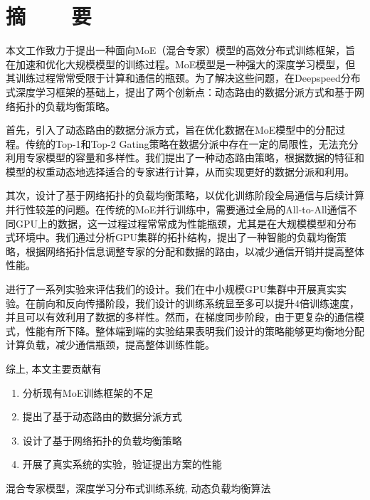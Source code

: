 \renewcommand{\baselinestretch}{1.5}
\fontsize{12pt}{13pt}\selectfont

\chapter[摘要]{摘~~~~要}

本文工作致力于提出一种面向MoE（混合专家）模型的高效分布式训练框架，旨在加速和优化大规模模型的训练过程。MoE模型是一种强大的深度学习模型，但其训练过程常常受限于计算和通信的瓶颈。为了解决这些问题，在Deepspeed分布式深度学习框架的基础上，提出了两个创新点：动态路由的数据分派方式和基于网络拓扑的负载均衡策略。

首先，引入了动态路由的数据分派方式，旨在优化数据在MoE模型中的分配过程。传统的Top-1和Top-2 Gating策略在数据分派中存在一定的局限性，无法充分利用专家模型的容量和多样性。我们提出了一种动态路由策略，根据数据的特征和模型的权重动态地选择适合的专家进行计算，从而实现更好的数据分派和利用。

其次，设计了基于网络拓扑的负载均衡策略，以优化训练阶段全局通信与后续计算并行性较差的问题。在传统的MoE并行训练中，需要通过全局的All-to-All通信不同GPU上的数据，这一过程过程常常成为性能瓶颈，尤其是在大规模模型和分布式环境中。我们通过分析GPU集群的拓扑结构，提出了一种智能的负载均衡策略，根据网络拓扑信息调整专家的分配和数据的路由，以减少通信开销并提高整体性能。

进行了一系列实验来评估我们的设计。我们在中小规模GPU集群中开展真实实验。在前向和反向传播阶段，我们设计的训练系统显至多可以提升4倍训练速度，并且可以有效利用了数据的多样性。然而，在梯度同步阶段，由于更复杂的通信模式，性能有所下降。整体端到端的实验结果表明我们设计的策略能够更均衡地分配计算负载，减少通信瓶颈，提高整体训练性能。

综上, 本文主要贡献有
\vspace{-10pt}
\begin{enumerate}
    \item 分析现有MoE训练框架的不足
    \item 提出了基于动态路由的数据分派方式
    \item 设计了基于网络拓扑的负载均衡策略
    \item 开展了真实系统的实验，验证提出方案的性能
\end{enumerate}
\vspace{-10pt}

\vspace{1em}
 \quad 混合专家模型，深度学习分布式训练系统, 动态负载均衡算法

\endinput
